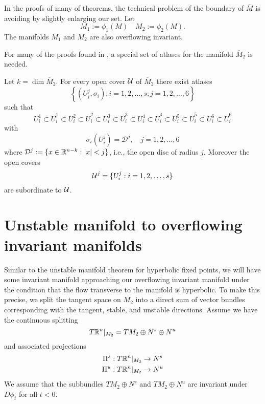 In the proofs of many of theorems, the technical problem of the boundary of \(\overline M\) is avoiding by slightly enlarging our set. Let 
\begin{equation}
	M_1 := \phi_1(M) \quad M_2 := \phi_2(M).
\end{equation}
The manifolds \(\overline M_1\) and \(\overline M_2\) are also overflowing invariant.

For many of the proofs found in \cite{wiggins1994normally}, a special set of atlases for the manifold \(\overline M_2\) is needed. 
\begin{prop}\label{atlases}
	Let \(k = \dim \overline M_2\). For every open cover \(\mathcal{U}\) of \(\overline M_2\) there exist atlases
	\begin{equation}
		\left\{  (U^j_i, \sigma_i) : i=1,2,\ldots, s; j = 1,2,\dots, 6 \right\}
	\end{equation}
	such that
	\begin{equation}
		U^1_i \subset \overline U^1_i  \subset U^2_i \subset \overline U^2_i  \subset U^3_i \subset \overline U^3_i  \subset U^4_i \subset \overline U^4_i  \subset U^5_i \subset \overline U^5_i  \subset U^6_i \subset \overline U^6_i  
	\end{equation}
	with 
	\begin{equation}
		\sigma_i(U^j_i) = \mathcal D^j, \quad j=1,2,\ldots, 6
	\end{equation}
	where \(\mathcal D^j := \{x\in \mathbb{R}^{n-k} : |x|< j\}\), i.e., the open disc of radius \(j\). Moreover the open covers
	\begin{equation}
		\mathcal{U}^j = \{U^j_i: i = 1,2,\ldots, s\}
	\end{equation}
	are subordinate to \(\mathcal{U}\).
\end{prop}
\section{Unstable manifold to overflowing invariant manifolds}\label{sec:unstable-manifold}

Similar to the unstable manifold theorem for hyperbolic fixed points, we will have some invariant manifold approaching our overflowing invariant manifold under the condition that the flow transverse to the manifold is hyperbolic. To make this precise, we split the tangent space on \(M_2\) into a direct sum of vector bundles corresponding with the tangent, stable, and unstable directions. Assume we have the continuous splitting
\begin{equation}
	T\mathbb{R}^n |_{M_2} = TM_2 \oplus N^s \oplus N^u 
\end{equation}
and associated projections
\begin{align}
	\Pi^s &: T\mathbb{R}^n|_{M_2} \to N^s \\
	\Pi^u &: T\mathbb{R}^n|_{M_2} \to N^u
\end{align}
We assume that the subbundles \(TM_2 \oplus N^s\) and \(TM_2 \oplus N^u\) are invariant under \(D\phi_t\) for all \(t< 0\).

